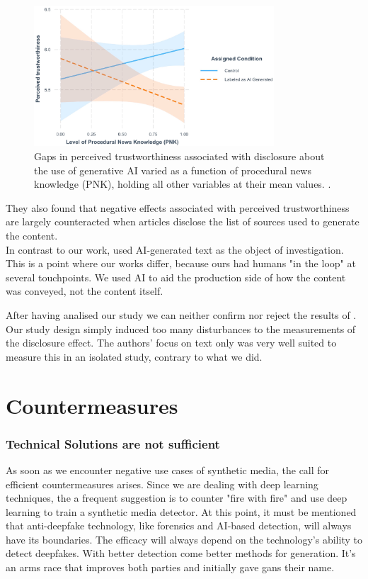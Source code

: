 \documentclass[
  a4paper,  %
  twoside,  %
  bibliography=totoc,
  headsepline,
  cleardoublepage=empty,
  parskip=half,
  draft=false
]{scrbook}
\begin{document}
\begin{figure}[h]
  \centering
  \includegraphics[width=0.8\textwidth]{./graphics/toff/PNK.png}
  \caption{Gaps in perceived trustworthiness associated with disclosure about the use of generative AI varied as a function of procedural news knowledge (PNK), holding all other variables at their mean values. \cite{toffTheyCouldJust2023}.}
  \label{fig:toff-PNK}
\end{figure}

They also found that negative effects associated with perceived trustworthiness are largely counteracted when articles disclose the list of sources used to generate the content. \\
In contrast to our work, \citeauthor{toffTheyCouldJust2023} used AI-generated text as the object of investigation. This is a point where our works differ, because ours had humans "in the loop" at several touchpoints. We used AI to aid the production side of how the content was conveyed, not the content itself.

After having analised our study we can neither confirm nor reject the results of \citet{toffTheyCouldJust2023}. Our study design simply induced too many disturbances to the measurements of the disclosure effect. The authors' focus on text only was very well suited to measure this in an isolated study, contrary to what we did. 

\section{Countermeasures}
\label{sec:rel-work-counteringdf}
\subsubsection*{Technical Solutions are not sufficient}
As soon as we encounter negative use cases of synthetic media, the call for efficient countermeasures arises. Since we are dealing with deep learning techniques, the a frequent suggestion is to counter "fire with fire" and use deep learning to train a synthetic media detector. At this point, it must be mentioned that anti-deepfake technology, like forensics and AI-based detection, will always have its boundaries. The efficacy will always depend on the technology's ability to detect deepfakes. With better detection come better methods for generation. It's an arms race that improves both parties and initially gave \gls{gan}s their name.
\end{document}
